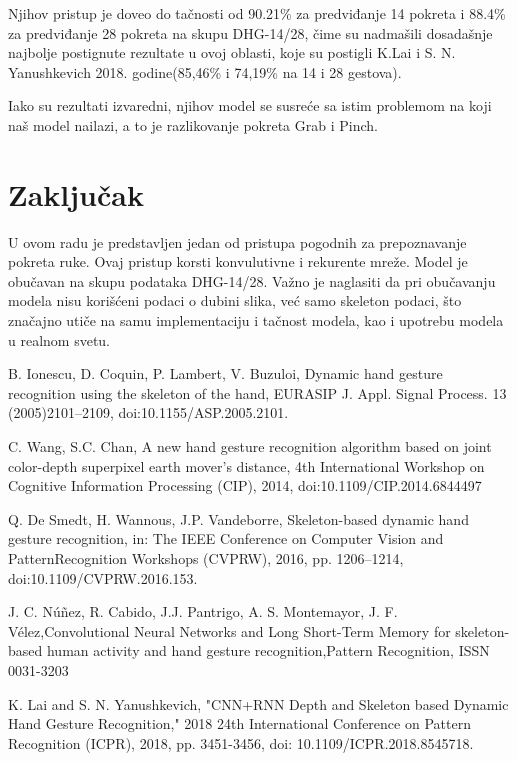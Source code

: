 \documentclass{article}
\begin{document}
Njihov pristup je doveo do tačnosti od 90.21\% za predviđanje 14 pokreta i 88.4\% za predviđanje 28 pokreta na skupu DHG-14/28, čime su nadmašili dosadašnje najbolje postignute rezultate u ovoj oblasti, koje su postigli K.Lai i S. N. Yanushkevich 2018. godine(85,46\% i 74,19\% na 14 i 28 gestova).
\newline

Iako su rezultati izvaredni, njihov model se susreće sa istim problemom na koji naš model nailazi, a to je razlikovanje pokreta Grab i Pinch.



\newpage

\section{Zaključak}

U ovom radu je predstavljen jedan od pristupa pogodnih za prepoznavanje pokreta ruke. Ovaj pristup korsti konvulutivne i rekurente mreže. Model je obučavan na skupu podataka DHG-14/28. Važno je naglasiti da pri obučavanju modela nisu korišćeni podaci o dubini slika, već samo skeleton podaci, što značajno utiče na samu implementaciju i tačnost modela, kao i upotrebu modela u realnom svetu.

\newpage

\begin{thebibliography}{6}

    B. Ionescu, D. Coquin, P. Lambert, V. Buzuloi, Dynamic hand gesture recognition using the skeleton of the hand, EURASIP J. Appl. Signal Process. 13 (2005)2101–2109, doi:10.1155/ASP.2005.2101.


	C. Wang, S.C. Chan, A new hand gesture recognition algorithm based on joint color-depth superpixel earth mover’s distance, 4th International Workshop on Cognitive Information Processing (CIP), 2014, doi:10.1109/CIP.2014.6844497
	
	 Q. De Smedt, H. Wannous, J.P. Vandeborre, Skeleton-based dynamic hand gesture recognition, in: The IEEE Conference on Computer Vision and PatternRecognition Workshops (CVPRW), 2016, pp. 1206–1214, doi:10.1109/CVPRW.2016.153.

	J. C. Núñez, R. Cabido, J.J. Pantrigo, A. S. Montemayor, J. F. Vélez,Convolutional Neural Networks and Long Short-Term Memory for skeleton-based human activity and hand gesture recognition,Pattern Recognition, ISSN 0031-3203

    K. Lai and S. N. Yanushkevich, "CNN+RNN Depth and Skeleton based Dynamic Hand Gesture Recognition," 2018 24th International Conference on Pattern Recognition (ICPR), 2018, pp. 3451-3456, doi: 10.1109/ICPR.2018.8545718.


\end{thebibliography}
\end{document}
